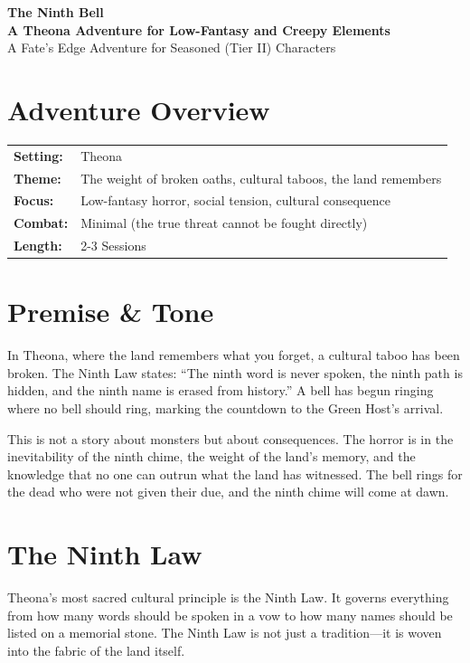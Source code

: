 \documentclass[11pt]{article}
\begin{document}


\begin{center}
    \textbf{\LARGE The Ninth Bell} \\
    \vspace{0.2cm}
    \textbf{A Theona Adventure for Low-Fantasy and Creepy Elements} \\
    \vspace{0.1cm}
    \small A Fate's Edge Adventure for Seasoned (Tier II) Characters
\end{center}

\section*{Adventure Overview}
\begin{longtable}{@{}ll}
    \textbf{Setting:} & Theona \\
    \textbf{Theme:} & The weight of broken oaths, cultural taboos, the land remembers \\
    \textbf{Focus:} & Low-fantasy horror, social tension, cultural consequence \\
    \textbf{Combat:} & Minimal (the true threat cannot be fought directly) \\
    \textbf{Length:} & 2-3 Sessions \\
\end{longtable}

\section*{Premise \& Tone}
In Theona, where the land remembers what you forget, a cultural taboo has been broken. The Ninth Law states: ``The ninth word is never spoken, the ninth path is hidden, and the ninth name is erased from history.'' A bell has begun ringing where no bell should ring, marking the countdown to the Green Host's arrival.

This is not a story about monsters but about consequences. The horror is in the inevitability of the ninth chime, the weight of the land's memory, and the knowledge that no one can outrun what the land has witnessed. The bell rings for the dead who were not given their due, and the ninth chime will come at dawn.

\section*{The Ninth Law}
Theona's most sacred cultural principle is the Ninth Law. It governs everything from how many words should be spoken in a vow to how many names should be listed on a memorial stone. The Ninth Law is not just a tradition---it is woven into the fabric of the land itself.
\end{document}
